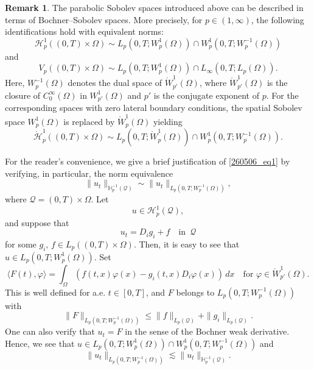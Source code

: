 \documentclass[reqno]{amsart}
\numberwithin{equation}{section}
\theoremstyle{plain}
\theoremstyle{definition}
\newtheorem{remark}[theorem]{Remark}
\def\bH{\mathbb{H}}
\def\cH{\mathcal{H}}
\def\cQ{\mathcal{Q}}
\begin{document}
\begin{remark}		\label{RMK_0}
The parabolic Sobolev spaces introduced above can be described in terms of Bochner--Sobolev spaces.
More precisely, for $p\in (1, \infty)$, the following identifications hold with equivalent norms:
\begin{equation}		\label{260506_eq1}
\cH^1_p((0,T)\times \Omega) \sim L_p(0,T;W^1_p(\Omega))\cap W^1_p(0,T; W^{-1}_{p}(\Omega))
\end{equation}
and 
$$
V_p((0,T)\times \Omega) \sim L_p(0,T;W^1_p(\Omega))\cap L_\infty(0,T; L_p(\Omega)).
$$
Here, $W^{-1}_{p}(\Omega)$ denotes the dual space of $\mathring{W}^{1}_{p'}(\Omega)$, where $\mathring{W}^{1}_{p'}(\Omega)$ is the closure of $C^\infty_0(\Omega)$ in $W^1_{p'}(\Omega)$  and $p'$ is the conjugate exponent of $p$.
For the corresponding spaces with zero lateral boundary conditions, the spatial Sobolev space $W^1_p(\Omega)$ is replaced by $\mathring W^1_p(\Omega)$ 
yielding
\[
\mathring{\cH}_p^1\left((0,T) \times \Omega\right) \sim L_p(0,T; \mathring{W}_p^1(\Omega)) \cap W_p^1 (0,T; W_p^{-1}(\Omega)).
\]

For the reader's convenience, we give a brief justification of  \eqref{260506_eq1} by verifying, in particular, the norm equivalence
$$
\|u_t\|_{\bH^{-1}_p(\cQ)} \sim \|u_t\|_{L_p(0,T; W^{-1}_p(\Omega))},
$$
where $\cQ=(0,T)\times \Omega$.
Let 
$$
u\in \cH^1_p(\cQ),
$$
and suppose that
$$
u_t=D_i g_i+f \quad \text{in }\, \cQ
$$
for some $g_i,\,f\in L_p((0,T)\times \Omega)$.
Then, it is easy to see that $u \in L_p(0,T; W_p^1(\Omega))$.
Set
\[
\langle F(t), \varphi \rangle = \int_\Omega \left(f(t,x) \varphi(x) - g_i(t,x) D_i\varphi(x) \right) \, dx \quad \text{for} \,\, \varphi \in \mathring{W}_{p'}^1(\Omega).
\]
This is well defined for a.e. $t \in [0,T]$,
and $F$ belongs to $L_p(0,T; W_p^{-1}(\Omega))$ with
\[
\|F\|_{L_p(0,T; W_p^{-1}(\Omega))} \leq \|f\|_{L_p(\cQ)}+\|g_i\|_{L_p(\cQ)}.
\]
One can also verify that $u_t = F$ in the sense of the Bochner weak derivative.
Hence, we see that $u \in L_p(0,T;W^1_p(\Omega))\cap W^1_p(0,T; W^{-1}_{p}(\Omega))$ and
$$
\|u_t\|_{L_p(0,T; W^{-1}_p(\Omega))}\lesssim \|u_t\|_{\bH^{-1}_p(\cQ)}.
$$


\end{remark}
\end{document}
